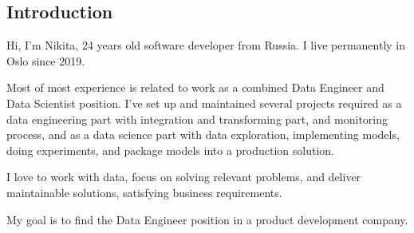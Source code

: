 \subsection*{Introduction}
    Hi, I'm Nikita, 24 years old software developer from Russia. 
    I live permanently in Oslo since 2019. 
        
    Most of most experience is related to work as a combined Data Engineer 
    and Data Scientist position. I've set up and maintained several projects 
    required as a data engineering part with integration and transforming part,
    and monitoring process, and as a data science part with data exploration, 
    implementing models, doing experiments, and package models into 
    a production solution.
        
    I love to work with data, focus on solving relevant problems, 
    and deliver maintainable solutions, satisfying business requirements. 

    My goal is to find the Data Engineer position in a product development
    company.

